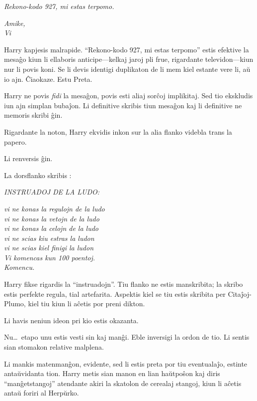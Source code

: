 \emph{Rekono-kodo 927, mi estas terpomo.}

\emph{Amike,\\
  Vi}

\medskip

Harry kapjesis malrapide. ``Rekono-kodo 927, mi estas terpomo'' estis
efektive la mesaĝo kiun li ellaboris anticipe—kelkaj jaroj pli frue,
rigardante televidon—kiun nur li povis koni. Se li devis identigi
duplikaton de li mem kiel estante vere li, aŭ io ajn. Ĉiaokaze. Estu Preta.

Harry ne povis \emph{fidi} la mesaĝon, povis esti aliaj sorĉoj
implikitaj. Sed tio ekskludis iun ajn simplan bubaĵon. Li definitive
skribis tiun mesaĝon kaj li definitive ne memoris skribi ĝin.

Rigardante la noton, Harry ekvidis inkon sur la alia flanko videbla
trans la papero.

Li renversis ĝin.

La dorsflanko skribis :
\medskip

\begin{center}
  \emph{INSTRUADOJ DE LA LUDO:}

  \emph{vi ne konas la regulojn de la ludo\\
    vi ne konas la vetojn de la ludo\\
    vi ne konas la celojn de la ludo\\
    vi ne scias kiu estras la ludon\\
    vi ne scias kiel finigi la ludon\\
    Vi komencas kun 100 poentoj.\\
    Komencu.}
\end{center}

\medskip

Harry fikse rigardis la ``instruadojn''. Tiu flanko ne estis
manskribita; la skribo estis perfekte regula, tial
artefarita. Aspektis kiel se tiu estis skribita per Citaĵoj-Plumo,
kiel tiu kiun li aĉetis por preni dikton.

Li havis neniun ideon pri kio estis okazanta.

Nu\ldots~etapo unu estis vesti sin kaj manĝi. Eble inversigi la ordon
de tio. Li sentis sian stomakon relative malplena.

Li mankis matenmanĝon, evidente, sed li estis preta por tiu
eventualaĵo, estinte antaŭvidanta tion. Harry metis sian manon en
lian haŭtpoŝon kaj diris ``manĝetstangoj'' atendante akiri la
skatolon de cerealaj stangoj, kiun li aĉetis antaŭ foriri al Herpŭrko.

